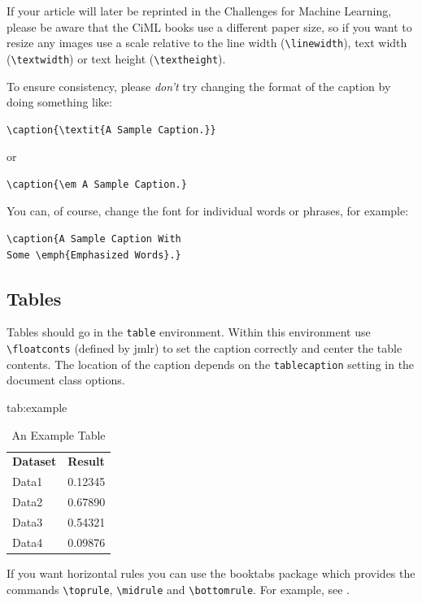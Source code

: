 \documentclass[pmlr,twocolumn,10pt]{jmlr} %
\begin{document}
If your article will later be reprinted in the Challenges for
Machine Learning, please be aware that the CiML books use a
different paper size, so if you want to resize any images use a
scale relative to the line width (\verb|\linewidth|), text width
(\verb|\textwidth|) or text height (\verb|\textheight|).

To ensure consistency, please \emph{don't} try changing the format of the caption by doing
something like:
\begin{verbatim}
\caption{\textit{A Sample Caption.}}
\end{verbatim}
or
\begin{verbatim}
\caption{\em A Sample Caption.}
\end{verbatim}
You can, of course, change the font for individual words or 
phrases, for example:
\begin{verbatim}
\caption{A Sample Caption With 
Some \emph{Emphasized Words}.}
\end{verbatim}

\subsection{Tables}
\label{sec:tables}

Tables should go in the \texttt{table} environment. Within this
environment use \verb|\floatconts| (defined by \textsf{jmlr})
to set the caption correctly and center the table contents.
The location of the caption depends on the \verb|tablecaption|
setting in the document class options.

\begin{table}[htbp]
\floatconts
  {tab:example}%
  {\caption{An Example Table}}%
  {\begin{tabular}{ll}
  \bfseries Dataset & \bfseries Result\\
  Data1 & 0.12345\\
  Data2 & 0.67890\\
  Data3 & 0.54321\\
  Data4 & 0.09876
  \end{tabular}}
\end{table}

If you want horizontal rules you can use the \textsf{booktabs}
package which provides the commands \verb|\toprule|, 
\verb|\midrule| and \verb|\bottomrule|. For example, see
.
\end{document}
